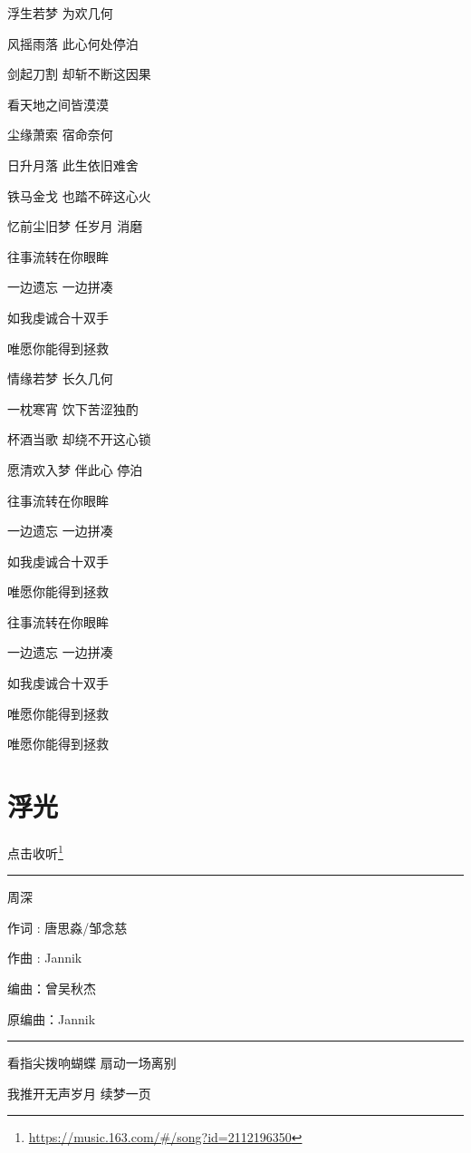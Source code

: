 \documentclass[]{ctexbook}
\renewcommand{\href}[2]{#2\footnote{\url{#1}}}
\begin{document}
浮生若梦 为欢几何

风摇雨落 此心何处停泊

剑起刀割 却斩不断这因果

看天地之间皆漠漠

尘缘萧索 宿命奈何

日升月落 此生依旧难舍

铁马金戈 也踏不碎这心火

忆前尘旧梦 任岁月 消磨

往事流转在你眼眸

一边遗忘 一边拼凑

如我虔诚合十双手

唯愿你能得到拯救

情缘若梦 长久几何

一枕寒宵 饮下苦涩独酌

杯酒当歌 却绕不开这心锁

愿清欢入梦 伴此心 停泊

往事流转在你眼眸

一边遗忘 一边拼凑

如我虔诚合十双手

唯愿你能得到拯救

往事流转在你眼眸

一边遗忘 一边拼凑

如我虔诚合十双手

唯愿你能得到拯救

唯愿你能得到拯救

\section*{浮光}\label{floating-light}


\href{https://music.163.com/\#/song?id=2112196350}{点击收听}

\begin{center}\rule{0.5\linewidth}{0.5pt}\end{center}

周深

作词 : 唐思淼/邹念慈

作曲 : Jannik

编曲：曾吴秋杰

原编曲：Jannik

\begin{center}\rule{0.5\linewidth}{0.5pt}\end{center}

看指尖拨响蝴蝶 扇动一场离别

我推开无声岁月 续梦一页
\end{document}
